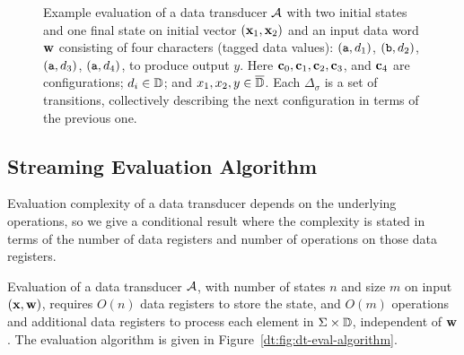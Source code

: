 \begin{figure}[t]
\centering \small
{}
\caption[Data transducer semantics illustration.]{Example evaluation of a data transducer $\mathcal{A}$ with two initial states and one final state on initial vector $(\mathbf{x}_1, \mathbf{x}_2)$ and an input data word $\mathbf{w}$ consisting of four characters (tagged data values):
$(\texttt{a},d_1)$, $(\texttt{b},d_2)$, $(\texttt{a},d_3)$, $(\texttt{a}, d_4)$, to produce output $y$.
Here $\mathbf{c}_0, \mathbf{c}_1, \mathbf{c}_2, \mathbf{c}_3$, and $\mathbf{c}_4$ are configurations; $d_i \in \mathbb{D}$; and $x_1, x_2, y \in \overline{\mathbb{D}{}}$. Each $\Delta_\sigma$ is a set of transitions, collectively describing the next configuration in terms of the previous one.}
\label{dt:fig:dt-eval-illustration}
\end{figure}

\subsection{Streaming Evaluation Algorithm}
Evaluation complexity of a data transducer depends on the underlying
operations, so we give a conditional result where the complexity
is stated in terms of the number of data registers and number of
operations on those data registers.

\begin{theorem}
Evaluation of a data transducer $\mathcal{A}$, with number of states $n$ and size $m$ on input $(\mathbf{x},\mathbf{w})$, requires
$O(n)$ data registers to store the state,
and $O(m)$ operations and additional data registers
to process each element in $\Sigma \times \mathbb{D}$, independent of $\mathbf{w}$.
The evaluation algorithm is given in Figure~\ref{dt:fig:dt-eval-algorithm}.
\label{dt:thm:dt-eval}
\end{theorem}

